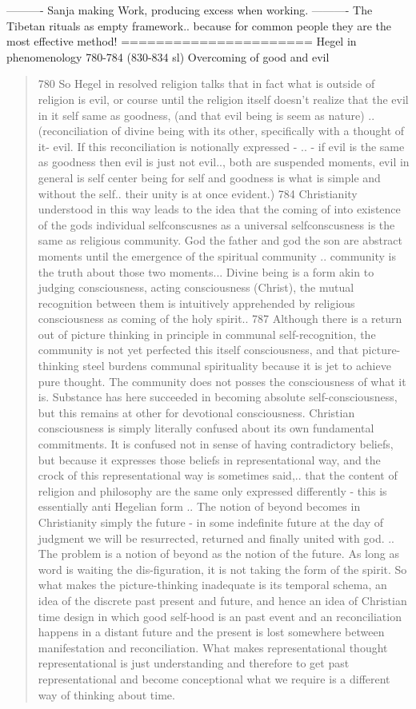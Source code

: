 \documentclass[10pt]{book}
\begin{document}
----------
Sanja making Work, producing excess when working.
----------
The Tibetan rituals as empty framework.. because for common people they are the most effective method!
======================
Hegel in phenomenology 780-784 (830-834 sl) Overcoming of good and evil
\begin{quotation}
780 So Hegel in resolved religion talks that in fact what is outside of religion is evil, or course until the religion itself doesn't realize that the evil in it self same as goodness, (and that evil being is seem as nature) .. (reconciliation of divine being with its other, specifically with a thought of it- evil. If this reconciliation is notionally expressed - .. - if evil is the same as goodness then evil is just not evil.., both are suspended moments, evil in general is self center being for self and goodness is what is simple and without the self.. their unity is at once evident.)
784 Christianity understood in this way leads to the idea that the coming of into existence of the gods individual selfconscusnes as a universal selfconscusness is the same as religious community. God the father and god the son are abstract moments until the emergence of the spiritual community .. community is the truth about those two moments... Divine being is a form akin to judging consciousness, acting consciousness (Christ), the mutual recognition between them is intuitively apprehended by religious consciousness as coming of the holy spirit..
787 Although there is a return out of picture thinking in principle in communal self-recognition, the community is not yet perfected this itself consciousness, and that picture-thinking steel burdens communal spirituality because it is jet to achieve pure thought. The community does not posses the consciousness of what it is. Substance has here succeeded in becoming absolute self-consciousness, but this remains at other for devotional consciousness. Christian consciousness is simply literally confused about its own fundamental commitments. It is confused not in sense of having contradictory beliefs, but because it expresses those beliefs in representational way, and the crock of this representational way is sometimes said,.. that the content of religion and philosophy are the same only expressed differently - this is essentially anti Hegelian form .. The notion of beyond becomes in Christianity simply the future - in some indefinite future at the day of judgment we will be resurrected, returned and finally united with god. .. The problem is a notion of beyond as the notion of the future. As long as word is waiting the dis-figuration, it is not taking the form of the spirit. So what makes the picture-thinking inadequate is its temporal schema, an idea of the discrete past present and future, and hence an idea of Christian time design in which good self-hood is an past event and an reconciliation happens in a distant future and the present is lost somewhere between manifestation and reconciliation. What makes representational thought representational is just understanding and therefore to get past representational and become conceptional what we require is a different way of thinking about time.

\end{quotation}
\end{document}
